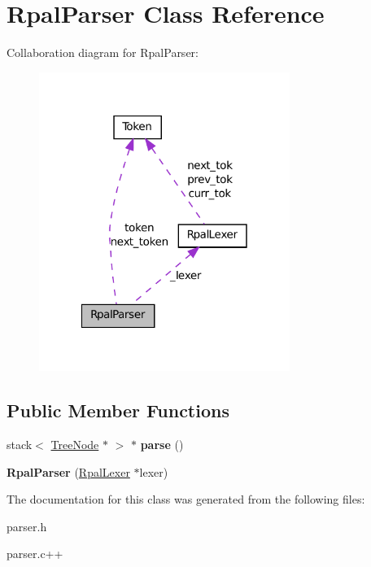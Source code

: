 \hypertarget{classRpalParser}{
\section{RpalParser Class Reference}
\label{classRpalParser}
}


Collaboration diagram for RpalParser:\nopagebreak
\begin{figure}[H]
\begin{center}
\leavevmode
\includegraphics[width=231pt]{classRpalParser__coll__graph}
\end{center}
\end{figure}
\subsection*{Public Member Functions}
\begin{DoxyCompactItemize}
\item 
\hypertarget{classRpalParser_a2252a6696fd900cee1acf1fb76bff546}{
stack$<$ \hyperlink{classTreeNode}{TreeNode} $\ast$ $>$ $\ast$ {\bfseries parse} ()}
\label{classRpalParser_a2252a6696fd900cee1acf1fb76bff546}

\item 
\hypertarget{classRpalParser_af1bf1d4d566c5011129f3bfe0aa4feb3}{
{\bfseries RpalParser} (\hyperlink{classRpalLexer}{RpalLexer} $\ast$lexer)}
\label{classRpalParser_af1bf1d4d566c5011129f3bfe0aa4feb3}

\end{DoxyCompactItemize}


The documentation for this class was generated from the following files:\begin{DoxyCompactItemize}
\item 
parser.h\item 
parser.c++\end{DoxyCompactItemize}

